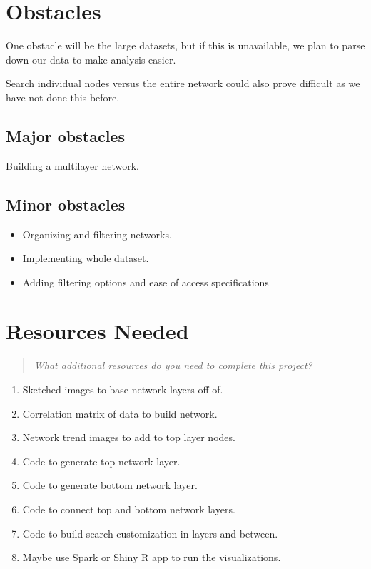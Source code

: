 \documentclass{proc}
\begin{document}
\section{Obstacles}

One obstacle will be the large datasets, but if this is unavailable, we plan to parse down our data to make analysis easier.

Search individual nodes versus the entire network could also prove difficult as we have not done this before.

\subsection{Major obstacles} %

Building a multilayer network.

\subsection{Minor obstacles}

\begin{itemize}
    \item Organizing and filtering networks. 
    \item Implementing whole dataset.
    \item Adding filtering options and ease of access specifications
\end{itemize}

\section{Resources Needed}
\begin{quote}
\textit{What additional resources do you need to complete this project?}
\end{quote}

\begin{enumerate}
    \item Sketched images to base network layers off of.
    \item Correlation matrix of data to build network.
    \item Network trend images to add to top layer nodes.
    \item Code to generate top network layer.
    \item Code to generate bottom network layer.
    \item Code to connect top and bottom network layers.
    \item Code to build search customization in layers and between.
    \item Maybe use Spark or Shiny R app to run the visualizations.
\end{enumerate}
\end{document}
